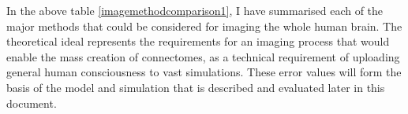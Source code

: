 

In the above table \ref{imagemethodcomparison1}, I have summarised each of the
major methods that could be considered for imaging the whole human brain. The
theoretical ideal represents the requirements for an imaging process that would
enable the mass creation of connectomes, as a technical requirement of uploading
general human consciousness to vast simulations. These error values will form
the basis of the model and simulation that is described and evaluated later in
this document.
